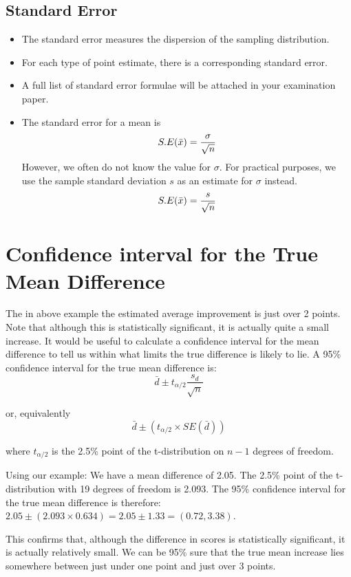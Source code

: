 \documentclass[]{report}
\begin{document}
\subsection{Standard Error}

\begin{itemize}
\item The standard error measures the dispersion of the sampling distribution.
\item For each type of point estimate, there is a corresponding standard error.
\item A full list of standard error formulae will be attached in your examination paper.
\item The standard error for a  mean is
\[ S.E( \bar{x} )  = {\sigma \over \sqrt{n}} \]
However, we often do not know the value for $\sigma$. For practical purposes, we use the sample standard deviation $s$ as an estimate for $\sigma$ instead.
\[ S.E( \bar{x} )  = {s \over \sqrt{n}} \]
\end{itemize}







\section{Confidence interval for the True Mean Difference}
The in above example the estimated average improvement is just over 2 points. Note that
although this is statistically significant, it is actually quite a small increase. It would be
useful to calculate a confidence interval for the mean difference to tell us within what limits
the true difference is likely to lie. A 95\% confidence interval for the true mean difference is:
\[\bar{d} \pm t_{\alpha/2} \frac{s_d}{\sqrt{n}}\]

or, equivalently 
\[\bar{d} \pm (t_{\alpha/2} \times SE(\bar{d}))\]

where $t_{\alpha/2}$ is the 2.5\% point of the t-distribution on $n-1$ degrees of freedom.

Using our example:
We have a mean difference of 2.05. The 2.5\% point of the t-distribution with 19 degrees
of freedom is 2.093. The 95\% confidence interval for the true mean difference is therefore:
$2.05 \pm (2.093 \times 0.634) = 2.05 \pm 1.33 = (0.72, 3.38)$.

This confirms that, although the difference in scores is statistically significant, it is actually
relatively small. We can be 95\% sure that the true mean increase lies somewhere between
just under one point and just over 3 points.
\end{document}
